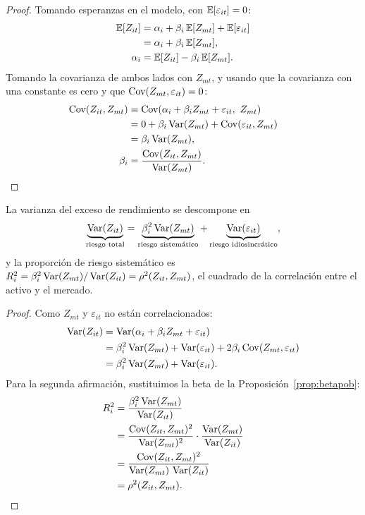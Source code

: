 \begin{proof}
Tomando esperanzas en el modelo, con $\mathbb{E}[\varepsilon_{it}]=0$:
\begin{align*}
  \mathbb{E}[Z_{it}] &= \alpha_i+\beta_i\,\mathbb{E}[Z_{mt}]+\mathbb{E}[\varepsilon_{it}]\\
             &= \alpha_i+\beta_i\,\mathbb{E}[Z_{mt}],\\
  \alpha_i   &= \mathbb{E}[Z_{it}]-\beta_i\,\mathbb{E}[Z_{mt}].
\end{align*}
Tomando la covarianza de ambos lados con $Z_{mt}$, y usando que la covarianza con una constante es cero y
que $\operatorname{Cov}(Z_{mt},\varepsilon_{it})=0$:
\begin{align*}
  \operatorname{Cov}(Z_{it},Z_{mt}) &= \operatorname{Cov}(\alpha_i+\beta_iZ_{mt}+\varepsilon_{it},\ Z_{mt})\\
                      &= 0+\beta_i\operatorname{Var}(Z_{mt})+\operatorname{Cov}(\varepsilon_{it},Z_{mt})\\
                      &= \beta_i\operatorname{Var}(Z_{mt}),\\
  \beta_i             &= \frac{\operatorname{Cov}(Z_{it},Z_{mt})}{\operatorname{Var}(Z_{mt})}. && \qedhere
\end{align*}
\end{proof}

\begin{proposicion}\label{prop:descriesgo}
La varianza del exceso de rendimiento se descompone en
\[
  \underbrace{\operatorname{Var}(Z_{it})}_{\text{riesgo total}}=\underbrace{\beta_i^2\operatorname{Var}(Z_{mt})}_{\text{riesgo sistemático}}
  +\underbrace{\operatorname{Var}(\varepsilon_{it})}_{\text{riesgo idiosincrático}},
\]
y la proporción de riesgo sistemático es $R^2_i=\beta_i^2\operatorname{Var}(Z_{mt})/\operatorname{Var}(Z_{it})=\rho^2(Z_{it},Z_{mt})$,
el cuadrado de la correlación entre el activo y el mercado.
\end{proposicion}

\begin{proof}
Como $Z_{mt}$ y $\varepsilon_{it}$ no están correlacionados:
\begin{align*}
  \operatorname{Var}(Z_{it}) &= \operatorname{Var}(\alpha_i+\beta_iZ_{mt}+\varepsilon_{it})\\
               &= \beta_i^2\operatorname{Var}(Z_{mt})+\operatorname{Var}(\varepsilon_{it})+2\beta_i\operatorname{Cov}(Z_{mt},\varepsilon_{it})\\
               &= \beta_i^2\operatorname{Var}(Z_{mt})+\operatorname{Var}(\varepsilon_{it}).
\end{align*}
Para la segunda afirmación, sustituimos la beta de la Proposición~\ref{prop:betapob}:
\begin{align*}
  R_i^2 &= \frac{\beta_i^2\operatorname{Var}(Z_{mt})}{\operatorname{Var}(Z_{it})}\\
        &= \frac{\operatorname{Cov}(Z_{it},Z_{mt})^2}{\operatorname{Var}(Z_{mt})^2}\cdot\frac{\operatorname{Var}(Z_{mt})}{\operatorname{Var}(Z_{it})}\\
        &= \frac{\operatorname{Cov}(Z_{it},Z_{mt})^2}{\operatorname{Var}(Z_{mt})\,\operatorname{Var}(Z_{it})}\\
        &= \rho^2(Z_{it},Z_{mt}). && \qedhere
\end{align*}
\end{proof}

